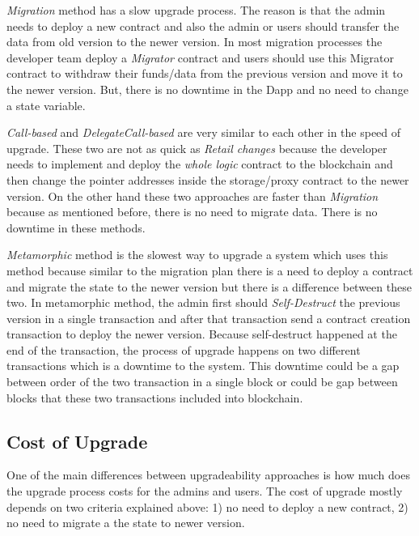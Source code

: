 \textit{Migration} method has a slow upgrade process. The reason is that the admin needs to deploy a new contract and also the admin or users should transfer the data from old version to the newer version. In most migration processes the developer team deploy a \textit{Migrator} contract and users should use this Migrator contract to withdraw their funds/data from the previous version and move it to the newer version. But, there is no downtime in the Dapp and no need to change a state variable.

\textit{Call-based} and \textit{DelegateCall-based} are very similar to each other in the speed of upgrade. These two are not as quick as \textit{Retail changes} because the developer needs to implement and deploy the \textit{whole logic} contract to the blockchain and then change the pointer addresses inside the storage/proxy contract to the newer version.
On the other hand these two approaches are faster than \textit{Migration} because as mentioned before, there is no need to migrate data. There is no downtime in these methods.

\textit{Metamorphic} method is the slowest way to upgrade a system which uses this method because similar to the migration plan there is a need to deploy a contract and migrate the state to the newer version but there is a difference between these two. In metamorphic method, the admin first should \textit{Self-Destruct} the previous version in a single transaction and after that transaction send a contract creation transaction to deploy the newer version. Because self-destruct happened at the end of the transaction, the process of upgrade happens on two different transactions which is a downtime to the system. This downtime could be a gap between order of the two transaction in a single block or could be gap between blocks that these two transactions included into blockchain. 


\subsection{Cost of Upgrade}

One of the main differences between upgradeability approaches is how much does the upgrade process costs for the admins and users. The cost of upgrade mostly depends on two criteria explained above: 1) no need to deploy a new contract, 2) no need to migrate a the state to newer version.

